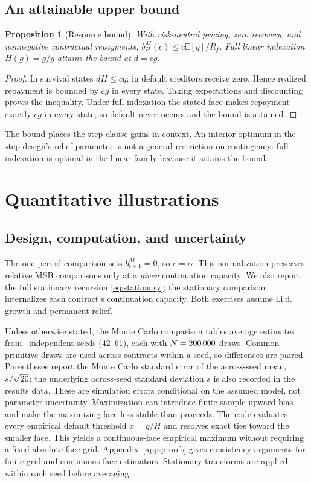 \documentclass[11pt]{article}
\newtheorem{proposition}{Proposition}
\newcommand{\E}{\mathbb E}
\begin{document}


\subsection{An attainable upper bound}
\begin{proposition}[Resource bound]\label{prop:bound}
With risk-neutral pricing, zero recovery, and nonnegative contractual repayments, $b_H^M(c)\le c\E[g]/R_f$. Full linear indexation $H(g)=g/\bar g$ attains the bound at $d=c\bar g$.
\end{proposition}
\begin{proof}
In survival states $dH\le cg$; in default creditors receive zero. Hence realized repayment is bounded by $cg$ in every state. Taking expectations and discounting proves the inequality. Under full indexation the stated face makes repayment exactly $cg$ in every state, so default never occurs and the bound is attained.
\end{proof}
The bound places the step-clause gains in context. An interior optimum in the step design's relief parameter is not a general restriction on contingency: full indexation is optimal in the linear family because it attains the bound.

\section{Quantitative illustrations}\label{sec:numerical}
\subsection{Design, computation, and uncertainty}\label{subsec:design}
The one-period comparison sets $b^M_{t+1}=0$, so $c=\alpha$. This normalization preserves relative MSB comparisons only at a \emph{given} continuation capacity. We also report the full stationary recursion \eqref{eq:stationary}; the stationary comparison internalizes each contract's continuation capacity. Both exercises assume i.i.d. growth and permanent relief.

Unless otherwise stated, the Monte Carlo comparison tables average estimates from \NumSeeds\ independent seeds (42--61), each with $N=200\,000$ draws. Common primitive draws are used across contracts within a seed, so differences are paired. Parentheses report the Monte Carlo standard error of the across-seed mean, $s/\sqrt{20}$; the underlying across-seed standard deviation $s$ is also recorded in the results data. These are simulation errors conditional on the assumed model, not parameter uncertainty. Maximization can introduce finite-sample upward bias and make the maximizing face less stable than proceeds. The code evaluates every empirical default threshold $x=g/H$ and resolves exact ties toward the smaller face. This yields a continuous-face empirical maximum without requiring a fixed absolute face grid. Appendix~\ref{app:proofs} gives consistency arguments for finite-grid and continuous-face estimators. Stationary transforms are applied within each seed before averaging.
\end{document}
